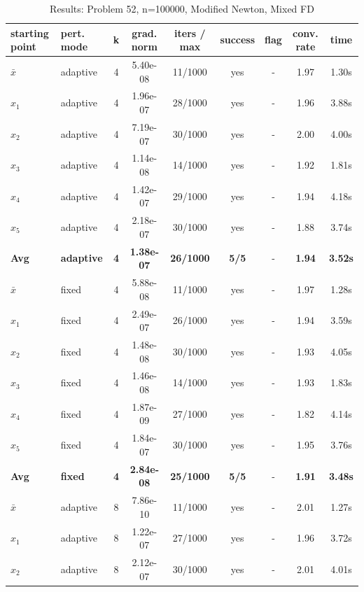 \begin{longtable}{|l|l|c|c|c|c|c|c|c|}
\caption{Results: Problem 52, n=100000, Modified Newton, Mixed FD} \\
\hline
\textbf{starting point} & \textbf{pert. mode} & \textbf{k} & \textbf{grad. norm} & \textbf{iters / max} & \textbf{success} & \textbf{flag} & \textbf{conv. rate} & \textbf{time} \\
\hline
\endfirsthead
\endhead
\endfoot
\hline
\endlastfoot
$\bar{x}$ & adaptive & 4 & 5.40e-08 & 11/1000 & yes & - & 1.97 & 1.30s \\
\hline
$x_1$ & adaptive & 4 & 1.96e-07 & 28/1000 & yes & - & 1.96 & 3.88s \\
\hline
$x_2$ & adaptive & 4 & 7.19e-07 & 30/1000 & yes & - & 2.00 & 4.00s \\
\hline
$x_3$ & adaptive & 4 & 1.14e-08 & 14/1000 & yes & - & 1.92 & 1.81s \\
\hline
$x_4$ & adaptive & 4 & 1.42e-07 & 29/1000 & yes & - & 1.94 & 4.18s \\
\hline
$x_5$ & adaptive & 4 & 2.18e-07 & 30/1000 & yes & - & 1.88 & 3.74s \\
\hline
\hline\hline
\textbf{Avg} & \textbf{adaptive} & \textbf{4} & \textbf{1.38e-07} & \textbf{26/1000} & \textbf{5/5} & - & \textbf{1.94} & \textbf{3.52s} \\
\hline\hline
\hline
$\bar{x}$ & fixed & 4 & 5.88e-08 & 11/1000 & yes & - & 1.97 & 1.28s \\
\hline
$x_1$ & fixed & 4 & 2.49e-07 & 26/1000 & yes & - & 1.94 & 3.59s \\
\hline
$x_2$ & fixed & 4 & 1.48e-08 & 30/1000 & yes & - & 1.93 & 4.05s \\
\hline
$x_3$ & fixed & 4 & 1.46e-08 & 14/1000 & yes & - & 1.93 & 1.83s \\
\hline
$x_4$ & fixed & 4 & 1.87e-09 & 27/1000 & yes & - & 1.82 & 4.14s \\
\hline
$x_5$ & fixed & 4 & 1.84e-07 & 30/1000 & yes & - & 1.95 & 3.76s \\
\hline
\hline\hline
\textbf{Avg} & \textbf{fixed} & \textbf{4} & \textbf{2.84e-08} & \textbf{25/1000} & \textbf{5/5} & - & \textbf{1.91} & \textbf{3.48s} \\
\hline\hline
$\bar{x}$ & adaptive & 8 & 7.86e-10 & 11/1000 & yes & - & 2.01 & 1.27s \\
\hline
$x_1$ & adaptive & 8 & 1.22e-07 & 27/1000 & yes & - & 1.96 & 3.72s \\
\hline
$x_2$ & adaptive & 8 & 2.12e-07 & 30/1000 & yes & - & 2.01 & 4.01s \\

\end{longtable}
